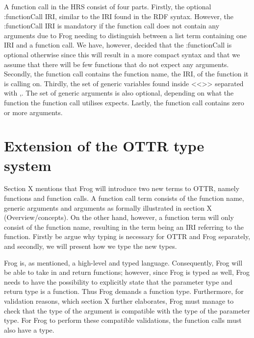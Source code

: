 \para 
A function call in the HRS consist of four parts. Firstly, the optional :functionCall IRI,  similar to the IRI found in the RDF syntax. However, the :functionCall  IRI is mandatory if the function call does not contain any arguments due to Frog needing to distinguish between a list term containing one IRI and a function call. We have, however, decided that the :functionCall is optional otherwise since this will result in a more compact syntax and that we assume that there will be few functions that do not expect any arguments. Secondly, the function call contains the function name, the IRI, of the function it is calling on. Thirdly, the set of generic variables found inside <<>> separated with ,.  The set of generic arguments is also optional, depending on what the function the function call utilises expects. Lastly, the function call contains zero or more arguments.


\section{Extension of the OTTR type system}
\label{extension_ottr_type}
Section X mentions that Frog will introduce two new terms to OTTR, namely functions and function calls. A function call term consists of the function name, generic arguments and arguments as formally illustrated in section X (Overview/concepts). On the other hand, however, a function term will only consist of the function name, resulting in the term being an IRI referring to the function. Firstly be argue why typing is necessary for OTTR and Frog separately, and secondly, we will present how we type the new types.

\para
Frog is, as mentioned, a high-level and typed language. Consequently, Frog will be able to take in and return functions; however, since Frog is typed as well, Frog needs to have the possibility to explicitly state that the parameter type and return type is a function. Thus Frog demands a function type. Furthermore, for validation reasons, which section X further elaborates, Frog must manage to check that the type of the argument is compatible with the type of the parameter type. For Frog to perform these compatible validations, the function calls must also have a type.

